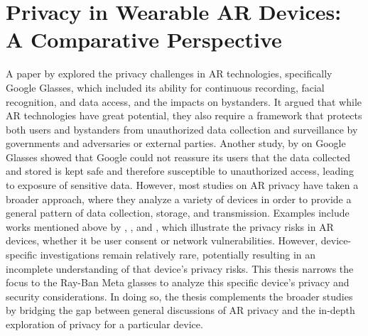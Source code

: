 \section*{Privacy in Wearable AR Devices: A Comparative Perspective}
A paper by \citet{Kotsios2015Privacy} explored the privacy challenges in AR technologies, specifically Google Glasses, which included its ability for continuous recording, facial recognition, and data access, and the impacts on bystanders. It argued that while AR technologies have great potential, they also require a framework that protects both users and bystanders from unauthorized data collection and surveillance by governments and adversaries or external parties. Another study, by \citet{safavi2014googleglass} on Google Glasses showed that Google could not reassure its users that the data collected and stored is kept safe and therefore susceptible to unauthorized access, leading to exposure of sensitive data. However, most studies on AR privacy have taken a broader approach, where they analyze a variety of devices in order to provide a general pattern of data collection, storage, and transmission. Examples include works mentioned above by \citet{Ren2019InformationEF}, \citet{Denning2014InSitu}, and \citet{Acar_2020}, which illustrate the privacy risks in AR devices, whether it be user consent or network vulnerabilities. However, device-specific investigations remain relatively rare, potentially resulting in an incomplete understanding of that device's privacy risks. This thesis narrows the focus to the Ray-Ban Meta glasses to analyze this specific device's privacy and security considerations. In doing so, the thesis complements the broader studies by bridging the gap between general discussions of AR privacy and the in-depth exploration of privacy for a particular device.





